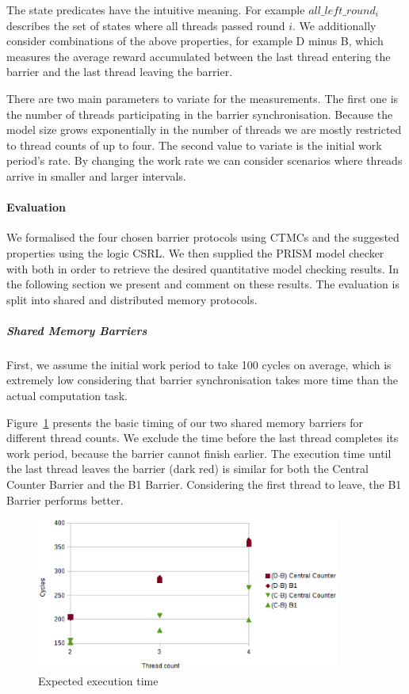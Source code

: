 \documentclass[a4paper, 10pt]{article}
\begin{document}
\noindent The state predicates have the intuitive meaning. For example $\mathit{all\_left\_round_{i}}$ describes the set of states where all threads passed round $i$.
We additionally consider combinations of the above properties, for example D minus B, which measures the average reward accumulated between the last thread entering the barrier and the last thread leaving the barrier.

There are two main parameters to variate for the measurements. The first one is the number of threads participating in the barrier synchronisation. Because the model size grows exponentially in the number of threads we are mostly restricted to thread counts of up to four.
The second value to variate is the initial work period's rate. By changing the work rate we can consider scenarios where threads arrive in smaller and larger intervals.

\paragraph{Evaluation}
\label{ssssec:analysis-modelchecking-quantitative-properties-evaluation}
We formalised the four chosen barrier protocols using CTMCs and the suggested properties using the logic CSRL.
We then supplied the PRISM model checker with both in order to retrieve the desired quantitative model checking results.
In the following section we present and comment on these results.
The evaluation is split into shared and distributed memory protocols.

\subparagraph{Shared Memory Barriers}
\label{sssssec:analysis-modelchecking-quantitative-properties-evaluation-shared}
First, we assume the initial work period to take 100 cycles on average, which is extremely low considering that barrier synchronisation takes more time than the actual computation task.

Figure~\ref{fig:c1-time-work-100-B-C-D} presents the basic timing of our two shared memory barriers for different thread counts. We exclude the time before the last thread completes its work period, because the barrier cannot finish earlier.
The execution time until the last thread leaves the barrier (dark red) is similar for both the Central Counter Barrier and the B1 Barrier.
Considering the first thread to leave, the B1 Barrier performs better.

\begin{figure}[htbp]
	\centering
	\includegraphics[width=10cm]{charts/c1-time-work-100-B-C-D}
	\caption{Expected execution time}
	\label{fig:c1-time-work-100-B-C-D}
\end{figure}
\end{document}
